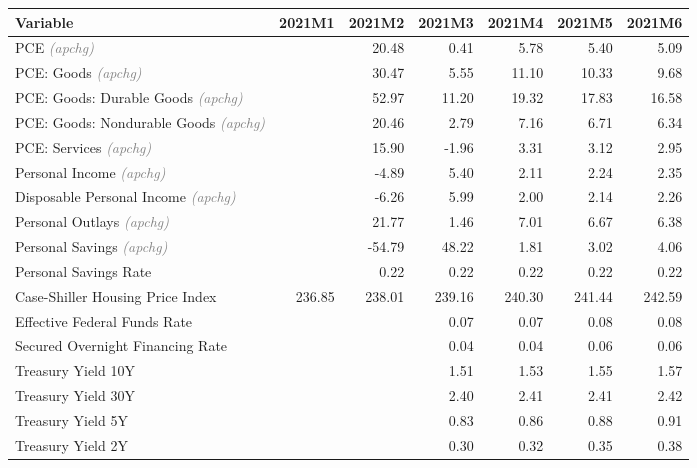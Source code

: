 \documentclass[11pt, letterpaper]{article}\usepackage[]{graphicx}\usepackage[]{color}
\begin{document}
\begin{table}[H]
\centering
\begingroup\fontsize{10pt}{12pt}\selectfont
\begin{tabular}{lrrrrrr}
  \hline
Variable & 2021M1 & 2021M2 & 2021M3 & 2021M4 & 2021M5 & 2021M6 \\ 
  \hline
PCE \textit{\footnotesize\textcolor{gray}{(apchg)}} &  & 20.48 & 0.41 & 5.78 & 5.40 & 5.09 \\ 
  PCE: Goods \textit{\footnotesize\textcolor{gray}{(apchg)}} &  & 30.47 & 5.55 & 11.10 & 10.33 & 9.68 \\ 
  PCE: Goods: Durable Goods \textit{\footnotesize\textcolor{gray}{(apchg)}} &  & 52.97 & 11.20 & 19.32 & 17.83 & 16.58 \\ 
  PCE: Goods: Nondurable Goods \textit{\footnotesize\textcolor{gray}{(apchg)}} &  & 20.46 & 2.79 & 7.16 & 6.71 & 6.34 \\ 
  PCE: Services \textit{\footnotesize\textcolor{gray}{(apchg)}} &  & 15.90 & -1.96 & 3.31 & 3.12 & 2.95 \\ 
  Personal Income \textit{\footnotesize\textcolor{gray}{(apchg)}} &  & -4.89 & 5.40 & 2.11 & 2.24 & 2.35 \\ 
  Disposable Personal Income \textit{\footnotesize\textcolor{gray}{(apchg)}} &  & -6.26 & 5.99 & 2.00 & 2.14 & 2.26 \\ 
  Personal Outlays \textit{\footnotesize\textcolor{gray}{(apchg)}} &  & 21.77 & 1.46 & 7.01 & 6.67 & 6.38 \\ 
  Personal Savings \textit{\footnotesize\textcolor{gray}{(apchg)}} &  & -54.79 & 48.22 & 1.81 & 3.02 & 4.06 \\ 
  Personal Savings Rate &  & 0.22 & 0.22 & 0.22 & 0.22 & 0.22 \\ 
  Case-Shiller Housing Price Index & 236.85 & 238.01 & 239.16 & 240.30 & 241.44 & 242.59 \\ 
  Effective Federal Funds Rate &  &  & 0.07 & 0.07 & 0.08 & 0.08 \\ 
  Secured Overnight Financing Rate &  &  & 0.04 & 0.04 & 0.06 & 0.06 \\ 
  Treasury Yield 10Y &  &  & 1.51 & 1.53 & 1.55 & 1.57 \\ 
  Treasury Yield 30Y &  &  & 2.40 & 2.41 & 2.41 & 2.42 \\ 
  Treasury Yield 5Y &  &  & 0.83 & 0.86 & 0.88 & 0.91 \\ 
  Treasury Yield 2Y &  &  & 0.30 & 0.32 & 0.35 & 0.38 \\ 

\end{tabular}
\end{table}
\end{document}
